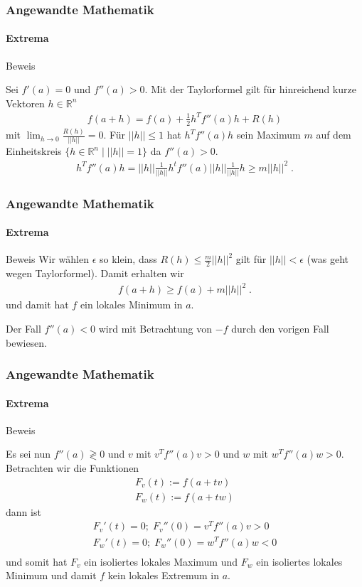 \documentclass{beamer}
\begin{document}
\begin{frame}
    \frametitle{Angewandte Mathematik}
\framesubtitle{Extrema}
    \begin{block}{Beweis}

Sei $f'(a) = 0$ und $f''(a) > 0$. Mit der Taylorformel gilt für hinreichend kurze Vektoren $h \in \mathbb{R}^n$
\begin{align*}
f(a + h) = f(a) + \frac{1}{2} h^T f''(a) h + R(h)
\end{align*}
mit $\lim_{h \to 0} \frac{R(h)}{ ||h||} = 0$. Für $||h|| \leq 1$ hat $ h^T f''(a) h $ sein Maximum $m$ auf dem Einheitskreis $\{ h \in \mathbb{R}^n \; | \; ||h|| = 1 \}$ da $f''(a) > 0$.
\begin{align*}
 h^T f''(a) h  = ||h|| \frac{1}{||h||} h^t  f''(a)  ||h|| \frac{1}{||h||} h \geq m ||h||^2 \;.
\end{align*}
\end{block}
 \end{frame}



\begin{frame}
    \frametitle{Angewandte Mathematik}
\framesubtitle{Extrema}
    \begin{block}{Beweis}
Wir wählen $\epsilon$ so klein, dass $R(h) \leq \frac{m}{2}  ||h||^2$ gilt für $||h|| < \epsilon$  (was geht wegen Taylorformel).
Damit erhalten wir
\begin{align*}
f(a + h) \geq f(a) +  m ||h||^2 \;.
\end{align*}
und damit hat $f$ ein lokales Minimum in $a$.

Der Fall $f''(a) < 0$ wird mit Betrachtung von $-f$ durch den vorigen Fall bewiesen.
\end{block}
 \end{frame}



\begin{frame}
    \frametitle{Angewandte Mathematik}
\framesubtitle{Extrema}
    \begin{block}{Beweis}


Es sei nun $f''(a) \gtrless 0$ und $v$ mit $v^T f''(a) v > 0$ und $w$ mit $w^T f''(a) w > 0$. Betrachten wir die Funktionen
\begin{align*}
F_v (t) := f(a + tv) \\
F_w(t) := f(a +tw)
\end{align*}
dann ist 
\begin{align*}
F_v' (t) = 0; \; F_v''(0) = v^T f''(a) v > 0 \\
F_w' (t) = 0; \; F_w''(0) = w^T f''(a) w < 0 \\
\end{align*}
und somit hat $F_v$ ein isoliertes lokales Maximum und $F_w$ ein isoliertes lokales Minimum und damit $f$ kein lokales Extremum  in  $a$.
\end{block}
 \end{frame}
\end{document}
